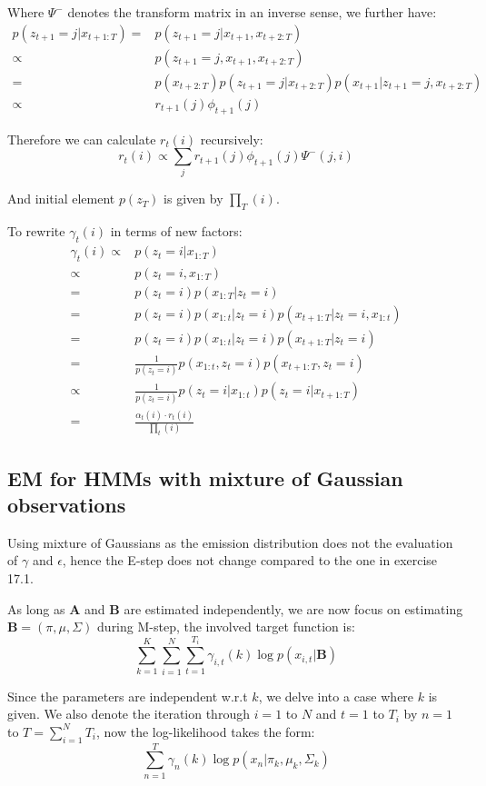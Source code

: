 \documentclass[UTF8]{ctexart}
\begin{document}
Where $\Psi^{-}$ denotes the transform matrix in an inverse sense, we further have:
\begin{align}
p(z_{t+1}=j|x_{t+1:T})=&p(z_{t+1}=j|x_{t+1},x_{t+2:T}) \nonumber \\
\propto&p(z_{t+1}=j,x_{t+1},x_{t+2:T}) \nonumber \\
=&p(x_{t+2:T})p(z_{t+1}=j|x_{t+2:T})p(x_{t+1}|z_{t+1}=j,x_{t+2:T}) \nonumber \\
\propto& r_{t+1}(j)\phi_{t+1}(j) \nonumber
\end{align}

Therefore we can calculate $r_{t}(i)$ recursively:
$$r_{t}(i)\propto \sum_{j}r_{t+1}(j)\phi_{t+1}(j)\Psi^{-}(j,i)$$

And initial element $p(z_{T})$ is given by $\prod_{T}(i)$.

To rewrite $\gamma_{t}(i)$ in terms of new factors:
\begin{align}
\gamma_{t}(i)\propto&p(z_{t}=i|x_{1:T})\nonumber \\
\propto& p(z_{t}=i,x_{1:T}) \nonumber \\
=&p(z_{t}=i)p(x_{1:T}|z_{t}=i)\nonumber \\
=&p(z_{t}=i)p(x_{1:t}|z_{t}=i)p(x_{t+1:T}|z_{t}=i,x_{1:t}) \nonumber \\
=&p(z_{t}=i)p(x_{1:t}|z_{t}=i)p(x_{t+1:T}|z_{t}=i) \nonumber \\
=&\frac{1}{p(z_{t}=i)}p(x_{1:t},z_{t}=i)p(x_{t+1:T},z_{t}=i) \nonumber \\
\propto&\frac{1}{p(z_{t}=i)}p(z_{t}=i|x_{1:t})p(z_{t}=i|x_{t+1:T}) \nonumber \\
=&\frac{\alpha_{t}(i)\cdot r_{t}(i)}{\prod_{t}(i)} \nonumber
\end{align}

\subsection{EM for HMMs with mixture of Gaussian observations}
Using mixture of Gaussians as the emission distribution does not the evaluation of $\gamma$ and $\epsilon$, hence the E-step does not change compared to the one in exercise 17.1.

As long as $\textbf{A}$ and $\textbf{B}$ are estimated independently, we are now focus on estimating $\textbf{B}=(\pi,\mu,\Sigma)$ during M-step, the involved target function is:
$$\sum_{k=1}^{K}\sum_{i=1}^{N}\sum_{t=1}^{T_{i}}\gamma_{i,t}(k)\log p(x_{i,t}|\textbf{B})$$

Since the parameters are independent w.r.t $k$, we delve into a case where $k$ is given. We also denote the iteration through $i=1$ to $N$ and $t=1$ to $T_{i}$ by $n=1$ to $T=\sum_{i=1}^{N}T_{i}$, now the log-likelihood takes the form:
$$\sum_{n=1}^{T}\gamma_{n}(k)\log p(x_{n}|\pi_{k},\mu_{k},\Sigma_{k})$$  
\end{document}
